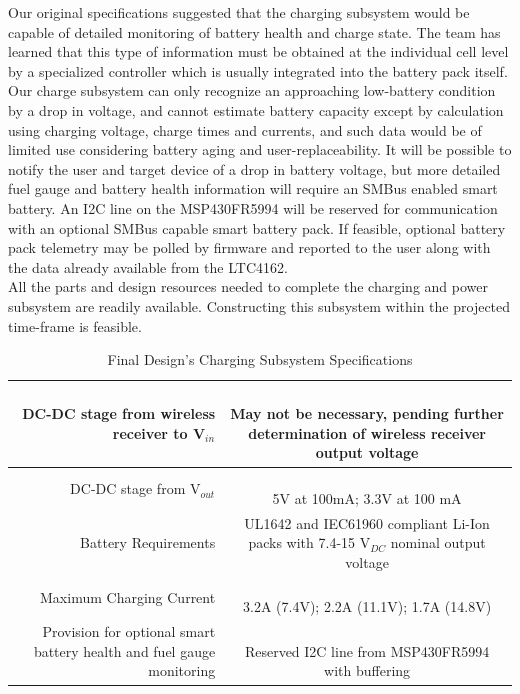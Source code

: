 \documentclass[12pt]{article}
\begin{document}
\indent
Our original specifications suggested that the charging subsystem would be capable of detailed monitoring of battery health and charge state. The team has learned that this type of information must be obtained at the individual cell level by a specialized controller which is usually integrated into the battery pack itself. Our charge subsystem can only recognize an approaching low-battery condition by a drop in voltage, and cannot estimate battery capacity except by calculation using charging voltage, charge times and currents, and such data would be of limited use considering battery aging and user-replaceability. It will be possible to notify the user and target device of a drop in battery voltage, but more detailed fuel gauge and battery health information will require an SMBus enabled smart battery. An I2C line on the MSP430FR5994 will be reserved for communication with an optional SMBus capable smart battery pack. If feasible, optional battery pack telemetry may be polled by firmware and reported to the user along with the data already available from the LTC4162.\\

\indent
All the parts and design resources needed to complete the charging and power subsystem are readily available. Constructing this subsystem within the projected time-frame is feasible.

\begin{table}[h!]
\centering
\caption{Final Design's Charging Subsystem  Specifications}
\begin{tabular} {| r | c | }
\hline
\parbox{0.3\linewidth}{\raggedleft DC-DC stage from wireless receiver to V$_{in}$} &   \parbox{0.65\linewidth}{\hfill \\
May not be necessary, pending further determination of wireless receiver output voltage}\\
\hline
\parbox{0.3\linewidth}{\raggedleft DC-DC stage from V$_{out}$} &   \parbox{0.65\linewidth}{\hfill \\
5V at 100mA; 3.3V at 100 mA}\\
\hline
\parbox{0.3\linewidth}{\raggedleft Battery Requirements} &   \parbox{0.65\linewidth}{\hfill \\
UL1642 and IEC61960 compliant Li-Ion packs with 7.4-15 V$_{DC}$ nominal output voltage}\\
\hline
\parbox{0.3\linewidth}{\raggedleft \vspace{0.4em} Maximum Charging Current} &   \parbox{0.65\linewidth}{\hfill \\
3.2A (7.4V); 2.2A (11.1V); 1.7A (14.8V)}\\
\hline
\parbox{0.3\linewidth}{\raggedleft \vspace{0.4em} Provision for optional smart battery health and fuel gauge monitoring} &   \parbox{0.65\linewidth}{\hfill \\
Reserved I2C line from MSP430FR5994 with buffering}\\
\hline
\end{tabular}
\end{table}
\hfill \\
\end{document}

